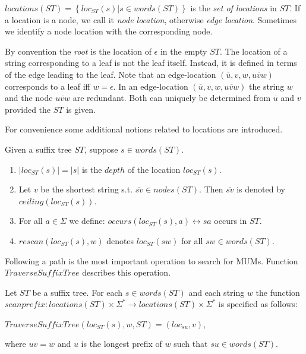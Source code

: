 \documentclass[conference]{IEEEtran}
\begin{document}
$locations(ST)=\left\lbrace loc_{ST}(s)|s\in words(ST)\right\rbrace$ is the \textit{set of locations} in $ST$. If a location is a node, we call it \textit{node location}, otherwise \textit{edge location}. Sometimes we identify a node location with the corresponding node.

By convention the \textit{root} is the location of $\epsilon$ in the empty $ST$. The location of a string corresponding to a leaf is not the leaf itself. Instead, it is defined in terms of the edge leading to the leaf. Note that an edge-location $(\overline{u},v,w,\overline{uvw})$ corresponds to a leaf iff $w=\epsilon$. In an edge-location $(\overline{u},v,w,\overline{uvw})$ the string $w$ and the node $\overline{uvw}$ are redundant. Both can uniquely be determined from $\overline{u}$ and $v$ provided the $ST$ is given.

For convenience some additional notions related to locations are introduced.
\begin{mydef}
Given a suffix tree $ST$, suppose $s \in words(ST)$.
\begin{enumerate}
\item $|loc_{ST}(s)|=|s|$ is the $depth$ of the location $loc_{ST}(s)$.
\item Let $v$ be the shortest string s.t. $\overline{sv} \in nodes(ST)$. Then $\overline{sv}$ is denoted by $ceiling(loc_{ST}(s))$.
\item For all $a \in \Sigma$ we define: $occurs(loc_{ST}(s),a)\longleftrightarrow sa$ occurs in $ST$.
\item $rescan(loc_{ST}(s),w)$ denotes $loc_{ST}(sw)$ for all $sw \in words(ST)$.
\end{enumerate}
\end{mydef}

Following a path is the most important operation to search for MUMs. Function $TraverseSuffixTree$ describes this operation.
\begin{mydef}
Let $ST$ be a suffix tree. For each $s \in words(ST)$ and each string $w$ the function $scanprefix: locations(ST)\times\Sigma^{*}\rightarrow locations(ST)\times\Sigma^{*}$ is specified as follows: 
\begin{center}
$TraverseSuffixTree(loc_{ST}(s),w,ST)=(loc_{su},v)$,
\end{center}
where $uv=w$ and $u$ is the longest prefix of $w$ such that $su \in words(ST)$.
\end{mydef}
\end{document}
